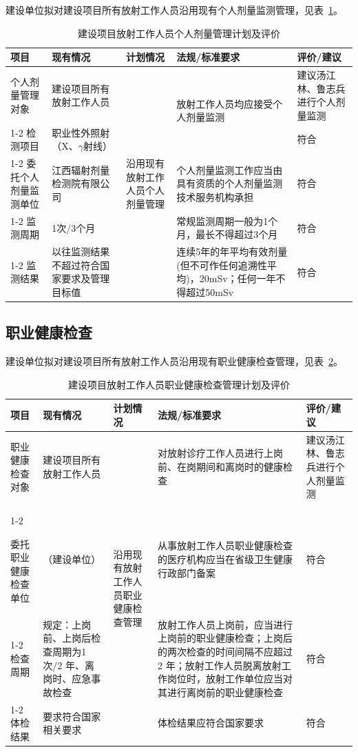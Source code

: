 建设单位拟对建设项目所有放射工作人员沿用现有个人剂量监测管理，见表~\ref{tab:8-3}。


\begin{table}[H]
\centering
\caption{建设项目放射工作人员个人剂量管理计划及评价}\label{tab:8-3}
\begin{tabular}{
|m{1.8cm}|m{2.4cm}|m{1.8cm}|m{5.2cm}|m{2.2cm}|
}
\hline
项目 & 现有情况 & 计划情况 & 法规/标准要求 & 评价/建议 \\
\hline
个人剂量管理对象
& 建设项目所有放射工作人员
& \multirow{5}{=}{沿用现有放射工作人员个人剂量管理}
& \multirow{2}{=}{放射工作人员均应接受个人剂量监测}
& 建议汤江林、鲁志兵进行个人剂量监测 \\
\cline{1-2}\cline{5-5}
检测项目
& 职业性外照射（X、$\gamma$射线）
&
&
& 符合 \\
\cline{1-2}\cline{4-5}
委托个人剂量监测单位
& 江西辐射剂量检测院有限公司
&
& 个人剂量监测工作应当由具有资质的个人剂量监测技术服务机构承担
& 符合 \\
\cline{1-2}\cline{4-5}
监测周期
& 1次/3个月
&
& 常规监测周期一般为1个月，最长不得超过3个月
& 符合 \\
\cline{1-2}\cline{4-5}
监测结果
& 以往监测结果不超过符合国家要求及管理目标值
&
& 连续5年的年平均有效剂量(但不可作任何追溯性平均)，20mSv；任何一年不得超过50mSv
& 符合 \\
\hline
\end{tabular}
\end{table}


\subsection{职业健康检查}

建设单位拟对建设项目所有放射工作人员沿用现有职业健康检查管理，见表~\ref{tab:ch8-3-t4-c29f11e5}。


\begin{table}[H]
\centering
\caption{建设项目放射工作人员职业健康检查管理计划及评价}
\label{tab:ch8-3-t4-c29f11e5}
\begin{tabular}{
|m{1.8cm}|m{2.4cm}|m{1.8cm}|m{5.2cm}|m{2.2cm}|
}
\hline
项目 & 现有情况 & 计划情况 & 法规/标准要求 & 评价/建议 \\
\hline
职业健康检查对象
& 建设项目所有放射工作人员
& \multirow{5}{=}{沿用现有放射工作人员职业健康检查管理}
& 对放射诊疗工作人员进行上岗前、在岗期间和离岗时的健康检查
& 建议汤江林、鲁志兵进行个人剂量监测 \\
\cline{1-2}\cline{4-5}

委托职业健康检查单位
& （建设单位）
&
& 从事放射工作人员职业健康检查的医疗机构应当在省级卫生健康行政部门备案
& 符合 \\
\cline{1-2}\cline{4-5}
检查周期
& 规定：上岗前、上岗后检查周期为1 次/2 年、离岗时、应急事故检查
&
& 放射工作人员上岗前，应当进行上岗前的职业健康检查；上岗后的两次检查的时间间隔不应超过 2 年；放射工作人员脱离放射工作岗位时，放射工作单位应当对其进行离岗前的职业健康检查
& 符合 \\
\cline{1-2}\cline{4-5}
体检结果
& 要求符合国家相关要求
&
& 体检结果应符合国家要求
& 符合 \\
\hline
\end{tabular}
\end{table}



